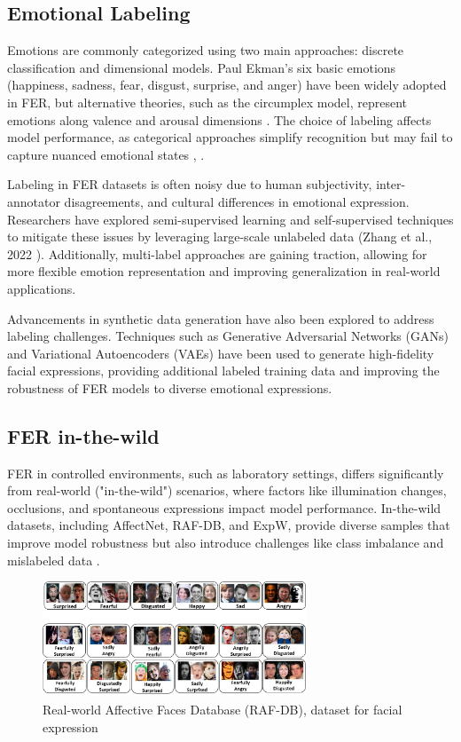 \subsection{Emotional Labeling}

Emotions are commonly categorized using two main approaches: discrete classification and dimensional models. Paul Ekman’s six basic emotions (happiness, sadness, fear, disgust, surprise, and anger) have been widely adopted in FER, but alternative theories, such as the circumplex model, represent emotions along valence and arousal dimensions \cite{russell_circumplex_1980}. The choice of labeling affects model performance, as categorical approaches simplify recognition but may fail to capture nuanced emotional states \cite{mollahosseini_affectnet_2019}, \cite{kollias_affect_2021}. 

Labeling in FER datasets is often noisy due to human subjectivity, inter-annotator disagreements, and cultural differences in emotional expression. Researchers have explored semi-supervised learning and self-supervised techniques to mitigate these issues by leveraging large-scale unlabeled data (Zhang et al., 2022 \cite{zhang_transformer-based_2022}). Additionally, multi-label approaches are gaining traction, allowing for more flexible emotion representation and improving generalization in real-world applications. 

Advancements in synthetic data generation have also been explored to address labeling challenges. Techniques such as Generative Adversarial Networks (GANs) and Variational Autoencoders (VAEs) have been used to generate high-fidelity facial expressions, providing additional labeled training data and improving the robustness of FER models to diverse emotional expressions. 

\subsection{FER in-the-wild}

FER in controlled environments, such as laboratory settings, differs significantly from real-world ("in-the-wild") scenarios, where factors like illumination changes, occlusions, and spontaneous expressions impact model performance. In-the-wild datasets, including AffectNet, RAF-DB, and ExpW, provide diverse samples that improve model robustness but also introduce challenges like class imbalance and mislabeled data \cite{zhang_leave_2023}. 


\begin{figure}
\centering
   \includegraphics[width=0.70\textwidth]{../images/faces_rafdb_dataset.png}
\caption{Real-world Affective Faces Database (RAF-DB), dataset for facial expression}
\label{fig:RAF-DB}
\end{figure}

